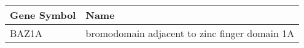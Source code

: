 \begin{tabular}{ll}
\toprule
Gene Symbol &                                          Name \\
\midrule
      BAZ1A & bromodomain adjacent to zinc finger domain 1A \\
\bottomrule
\end{tabular}
